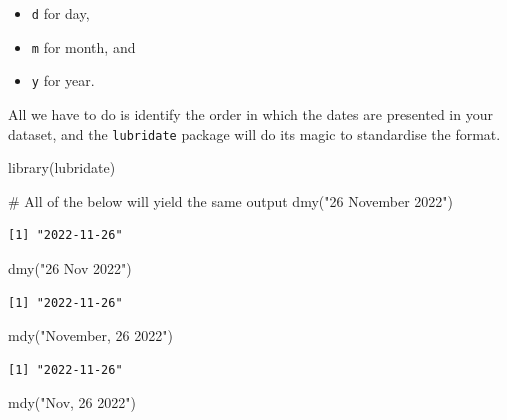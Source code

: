 \documentclass[
  letterpaper,
]{krantz}
\makeatletter
\newenvironment{Shaded}{\begin{snugshade}}{\end{snugshade}}
\newcommand{\CommentTok}[1]{\textcolor[rgb]{0.37,0.37,0.37}{#1}}
\newcommand{\FunctionTok}[1]{\textcolor[rgb]{0.28,0.35,0.67}{#1}}
\newcommand{\NormalTok}[1]{\textcolor[rgb]{0.00,0.23,0.31}{#1}}
\newcommand{\StringTok}[1]{\textcolor[rgb]{0.13,0.47,0.30}{#1}}
\newenvironment{kframe}{%
\medskip{}
\setlength{\fboxsep}{.8em}
 \def\at@end@of@kframe{}%
 \ifinner\ifhmode%
  \def\at@end@of@kframe{\end{minipage}}%
  \begin{minipage}{\columnwidth}%
 \fi\fi%
 \def\FrameCommand##1{\hskip\@totalleftmargin \hskip-\fboxsep
 \colorbox{shadecolor}{##1}\hskip-\fboxsep
     \hskip-\linewidth \hskip-\@totalleftmargin \hskip\columnwidth}%
 \MakeFramed {\advance\hsize-\width
   \@totalleftmargin\z@ \linewidth\hsize
   \@setminipage}}%
 {\par\unskip\endMakeFramed%
 \at@end@of@kframe}
\renewenvironment{Shaded}{\begin{kframe}}{\end{kframe}}
\makeatother
\begin{document}
\begin{itemize}
\item
  \texttt{d} for day,
\item
  \texttt{m} for month, and
\item
  \texttt{y} for year.
\end{itemize}

All we have to do is identify the order in which the dates are presented
in your dataset, and the \texttt{lubridate} package will do its magic to
standardise the format.

\begin{Shaded}
\begin{Highlighting}[]
\FunctionTok{library}\NormalTok{(lubridate)}

\CommentTok{\# All of the below will yield the same output}
\FunctionTok{dmy}\NormalTok{(}\StringTok{"26 November 2022"}\NormalTok{)}
\end{Highlighting}
\end{Shaded}

\begin{verbatim}
[1] "2022-11-26"
\end{verbatim}

\begin{Shaded}
\begin{Highlighting}[]
\FunctionTok{dmy}\NormalTok{(}\StringTok{"26 Nov 2022"}\NormalTok{)}
\end{Highlighting}
\end{Shaded}

\begin{verbatim}
[1] "2022-11-26"
\end{verbatim}

\begin{Shaded}
\begin{Highlighting}[]
\FunctionTok{mdy}\NormalTok{(}\StringTok{"November, 26 2022"}\NormalTok{)}
\end{Highlighting}
\end{Shaded}

\begin{verbatim}
[1] "2022-11-26"
\end{verbatim}

\begin{Shaded}
\begin{Highlighting}[]
\FunctionTok{mdy}\NormalTok{(}\StringTok{"Nov, 26 2022"}\NormalTok{)}
\end{Highlighting}
\end{Shaded}
\end{document}
